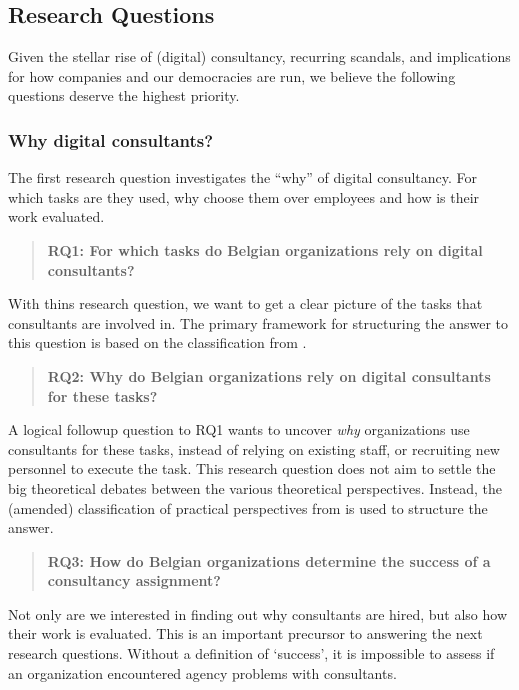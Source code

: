 \documentclass[12pt]{article}
\begin{document}
\subsection{Research Questions}\label{research-questions}

Given the stellar rise of (digital) consultancy, recurring scandals, and
implications for how companies and our democracies are run, we believe
the following questions deserve the highest priority.

\subsubsection{Why digital consultants?}\label{why-digital-consultants}

The first research question investigates the ``why'' of digital
consultancy. For which tasks are they used, why choose them over
employees and how is their work evaluated.

\begin{quote}
\textbf{RQ1: For which tasks do Belgian organizations rely on digital
consultants?}
\end{quote}

With thins research question, we want to get a clear picture of the
tasks that consultants are involved in. The primary framework for
structuring the answer to this question is based on the classification
from \citet{turner1982}.

\begin{quote}
\textbf{RQ2: Why do Belgian organizations rely on digital consultants
for these tasks?}
\end{quote}

A logical followup question to RQ1 wants to uncover \emph{why}
organizations use consultants for these tasks, instead of relying on
existing staff, or recruiting new personnel to execute the task. This
research question does not aim to settle the big theoretical debates
between the various theoretical perspectives. Instead, the (amended)
classification of practical perspectives from \citet{lacity1994} is used
to structure the answer.

\begin{quote}
\textbf{RQ3: How do Belgian organizations determine the success of a
consultancy assignment?}
\end{quote}

Not only are we interested in finding out why consultants are hired, but
also how their work is evaluated. This is an important precursor to
answering the next research questions. Without a definition of
`success', it is impossible to assess if an organization encountered
agency problems with consultants.
\end{document}
